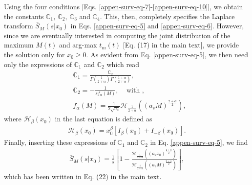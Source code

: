 \documentclass[superscriptaddress,amsmath,amssymb,aps,onecolumn]{revtex4}
\begin{document}
Using the four conditions [Eqs. \eqref{appen-surv-eq-7}-\eqref{appen-surv-eq-10}], we obtain the constants $\mathbb{C}_1,~\mathbb{C}_2,~\mathbb{C}_3$ and $\mathbb{C}_4$. This, then, completely specifies the Laplace transform $\bar{S}_M(s|x_0)$ in Eqs. \eqref{appen-surv-eq-5} and \eqref{appen-surv-eq-6}. However, since we are eventually interested in computing the joint distribution of the maximum $M(t)$ and arg-max $t_m(t)$ [Eq. (17) in the main text], we provide the solution only for $x_0 \geq 0$. As evident from Eq. \eqref{appen-surv-eq-5}, we then need only the expressions of $\mathbb{C}_1$ and $\mathbb{C}_2$ which read
\begin{align}
& \mathbb{C}_1 = \frac{\mathbb{C}_2}{\Gamma \left(\frac{1}{2+\alpha} \right) \Gamma \left(\frac{1+\alpha}{2+\alpha} \right)}, \label{appen-surv-eq-11} \\
& \mathbb{C}_2 = -\frac{1}{s f _{\alpha}(M)},~~~~~\text{with },\label{appen-surv-eq-12} \\
&f _{\alpha}(M) = \frac{1}{2\sqrt{a_s}} \mathcal{H}_{\frac{1}{2+\alpha}} \left( (a_s M)^{\frac{2+\alpha}{2}} \right),
\end{align}
where $\mathcal{H}_{\beta}(x_0)$ in the last equation is defined as
\begin{align}
\mathcal{H}_{\beta} (x_0) = x_0 ^{\beta} \left[ I _{\beta}(x_0)+I_{-\beta} (x_0)\right]. \label{new-appen-extreme-eq-8} 
\end{align}
Finally, inserting these expressions of $ \mathbb{C}_1$ and $ \mathbb{C}_2$ in Eq. \eqref{appen-surv-eq-5}, we find 
\begin{align}
\bar{S}_M(s|x_0) = \frac{1}{s} \left[1- \frac{\mathcal{H}_{\frac{1}{2+\alpha}} \left( (a_s x_0)^{\frac{2+\alpha}{2}} \right)}{\mathcal{H}_{\frac{1}{2+\alpha}} \left( (a_s M)^{\frac{2+\alpha}{2}} \right)} \right],
\label{appen-surv-eq-13} 
\end{align}
which has been written in Eq. (22) in the main text.
\end{document}
